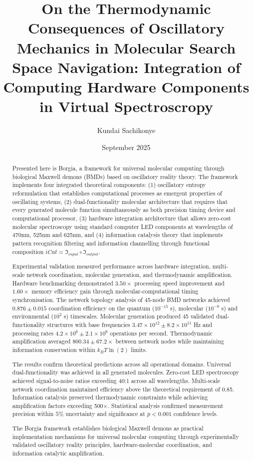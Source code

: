 \documentclass[12pt,a4paper]{article}
\title{On the Thermodynamic Consequences of Oscillatory Mechanics in Molecular Search Space Navigation: Integration of Computing Hardware Components in Virtual Spectroscropy}
\author{Kundai Sachikonye}
\date{September 2025}
\begin{document}
\maketitle
\begin{abstract}

Presented here is Borgia, a framework for universal molecular computing through biological Maxwell demons (BMDs) based on oscillatory reality theory. The framework implements four integrated theoretical components: (1) oscillatory entropy reformulation that establishes computational processes as emergent properties of oscillating systems, (2) dual-functionality molecular architecture that requires that every generated molecule function simultaneously as both precision timing device and computational processor, (3) hardware integration architecture that allows zero-cost molecular spectroscopy using standard computer LED components at wavelengths of 470nm, 525nm and 625nm, and (4) information catalysis theory that implements pattern recognition filtering and information channelling through functional composition $iCat = \mathfrak{I}_{input} \circ \mathfrak{I}_{output}$.

Experimental validation measured performance across hardware integration, multi-scale network coordination, molecular generation, and thermodynamic amplification. Hardware benchmarking demonstrated $3.50 \times$ processing speed improvement and $1.60 \times$ memory efficiency gain through molecular-computational timing synchronisation. The network topology analysis of 45-node BMD networks achieved $0.876 \pm 0.015$ coordination efficiency on the quantum ($10^{-15}$ s), molecular ($10^{-9}$ s) and environmental ($10^2$ s) timescales. Molecular generation produced 45 validated dual-functionality structures with base frequencies $3.47 \times 10^{12} \pm 8.2 \times 10^{11}$ Hz and processing rates $4.2 \times 10^6 \pm 2.1 \times 10^6$ operations per second. Thermodynamic amplification averaged $800.34 \pm 67.2 \times$ between network nodes while maintaining information conservation within $k_B T \ln(2)$ limits.

The results  confirm theoretical predictions across all operational domains. Universal dual-functionality was achieved in all generated molecules. Zero-cost LED spectroscopy achieved signal-to-noise ratios exceeding 40:1 across all wavelengths. Multi-scale network coordination maintained efficiency above the theoretical requirement of 0.85. Information catalysis preserved thermodynamic constraints while achieving amplification factors exceeding 500×. Statistical analysis confirmed measurement precision within $5\%$ uncertainty and significance at $p < 0.001$ confidence levels.

The Borgia framework establishes biological Maxwell demons as practical implementation mechanisms for universal molecular computing through experimentally validated oscillatory reality principles, hardware-molecular coordination, and information catalytic amplification.

\end{abstract}
\end{document}
